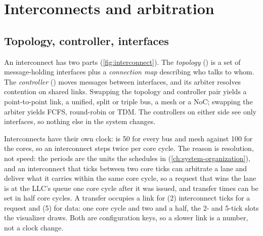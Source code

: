 \chapter{Interconnects and arbitration}\label{ch:interconnects}


\section{Topology, controller, interfaces}


An interconnect has two parts (\cref{fig:interconnect}). The \emph{topology}
() is a set of message-holding interfaces plus a \emph{connection
map} describing who talks to whom. The \emph{controller} () moves
messages between interfaces, and its arbiter resolves contention on shared links. Swapping the topology and controller pair yields a point-to-point
link, a unified, split or triple bus, a mesh or a NoC; swapping the arbiter yields FCFS,
round-robin or TDM. The controllers on either side see only interfaces, so nothing else in the
system changes.

Interconnects have their own clock:  is 50 for every bus and mesh against
100 for the cores, so an interconnect steps twice per core cycle. The reason is resolution, not
speed: the periods are the units the  schedules in (\cref{ch:system-organization}),
and an interconnect that ticks between two core ticks can arbitrate a lane and deliver what it
carries within the same core cycle, so a request that wins the lane is at the LLC's queue one
core cycle after it was issued, and transfer times can be set in half core cycles. A transfer
occupies a link for  (2) interconnect ticks for a request and
 (5) for data: one core cycle and two and a half, the 2- and 5-tick
slots the visualizer draws. Both are configuration keys, so a slower link is a number, not a
clock change.

